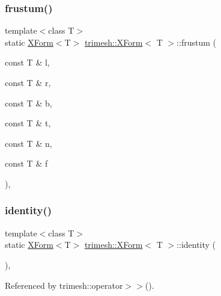 \mbox{\label{classtrimesh_1_1XForm_ab44ff4f0cc02804ee0915b3930e3c4db}} 
\subsubsection{\texorpdfstring{frustum()}{frustum()}}
{\footnotesize\ttfamily template$<$class T$>$ \\
static \hyperlink{classtrimesh_1_1XForm}{X\+Form}$<$T$>$ \hyperlink{classtrimesh_1_1XForm}{trimesh\+::\+X\+Form}$<$ T $>$\+::frustum (\begin{DoxyParamCaption}\item[{const T \&}]{l,  }\item[{const T \&}]{r,  }\item[{const T \&}]{b,  }\item[{const T \&}]{t,  }\item[{const T \&}]{n,  }\item[{const T \&}]{f }\end{DoxyParamCaption})\hspace{0.3cm}{\ttfamily [inline]}, {\ttfamily [static]}}

\mbox{\label{classtrimesh_1_1XForm_a48c04ec2a96aa40027ca977191c0e167}} 
\subsubsection{\texorpdfstring{identity()}{identity()}}
{\footnotesize\ttfamily template$<$class T$>$ \\
static \hyperlink{classtrimesh_1_1XForm}{X\+Form}$<$T$>$ \hyperlink{classtrimesh_1_1XForm}{trimesh\+::\+X\+Form}$<$ T $>$\+::identity (\begin{DoxyParamCaption}{ }\end{DoxyParamCaption})\hspace{0.3cm}{\ttfamily [inline]}, {\ttfamily [static]}}



Referenced by trimesh\+::operator$>$$>$().

\mbox{\label{classtrimesh_1_1XForm_a0782fcfe145735c39e01ef4c4fc263cb}} 
